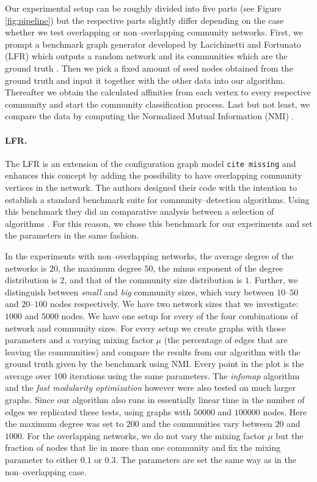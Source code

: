 Our experimental setup can be roughly divided into five parts (see Figure \ref{fig:pipeline}) but the respective parts slightly differ depending on the case whether we test overlapping or non--overlapping community networks. First, we prompt a benchmark graph generator developed by Lacichinetti and Fortunato (LFR) \cite{LFR08}\cite{LFR09} which outputs a random network and its communities which are the ground truth . Then we pick a fixed amount of seed nodes obtained from the ground truth and input it together 
with the other data into our algorithm. Thereafter we obtain the calculated 
affinities from each vertex to every respective community and start the 
community classification process. Last but not least, we compare the data by 
computing the Normalized Mutual Information (NMI) \cite{DDDA05}.


\paragraph{LFR.}
The LFR is an extension of the configuration graph model \texttt{cite missing} and enhances this concept by adding the possibility to have overlapping community vertices in the network. The authors designed their code with the intention to establish a standard benchmark suite for community--detection algorithms. Using this benchmark they did an comparative analysis between a selection of algorithms \cite{LF09}. For this reason, we chose this benchmark for our experiments and set the parameters in the same fashion. 

In the experiments with non--overlapping networks, the average degree of the networks is $20$, the maximum degree $50$, the minus exponent of the degree distribution is $2$, and that of the community size distribution is $1$. Further, we distinguish between \textit{small} and \textit{big} community sizes, which vary between $10$--$50$ and $20$--$100$ nodes respectively. We have two network sizes that we investigate: $1000$ and $5000$ nodes. We have one setup for every of the four combinations of network and community sizes. For every setup we create graphs with those parameters and a varying mixing factor $\mu$ (the percentage of edges that are leaving the communities) and compare the results from our algorithm with the ground truth given by the benchmark using NMI. Every point in the plot is the average over $100$ iterations using the same parameters. The \textit{infomap} algorithm \cite{RB08} and the \textit{fast modularity optimization} \cite{BGLL08} however were also tested on much larger graphs. Since our algorithm also runs in essentially linear time in the number of edges we replicated these tests, using graphs with $50000$ and $100000$ nodes. Here the maximum degree was set to $200$ and the communities vary between $20$ and $1000$. For the overlapping networks, we do not vary the mixing factor $\mu$ but the fraction of nodes that lie in more than one community and fix the mixing parameter to either $0.1$ or $0.3$. The parameters are set the same way as in the non--overlapping case.


